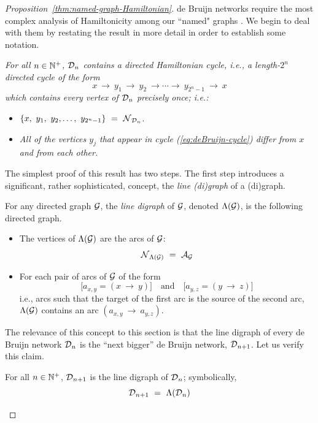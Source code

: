 \begin{proof}[Proposition~\ref{thm:named-graph-Hamiltonian}]
de Bruijn networks require the most complex analysis of Hamiltonicity among our  ``named" graphs .  We begin to deal with them by restating the result in more detail in order to establish some notation.

\medskip

\noindent
{\em
For all $n \in \mathbb{N}^+$, $\mbox{$\cal D$}_n$ contains a {\em directed Hamiltonian cycle}, i.e., a length-$2^n$ 
directed cycle of the form}
\begin{equation}
\label{eq:deBruijn-cycle}
 x \ \rightarrow \ y_1 \ \rightarrow \ y_2 \ \rightarrow \cdots  \rightarrow \ y_{2^n-1} \ \rightarrow \ x
\end{equation}
{\em which contains every vertex of $\mbox{$\cal D$}_n$ precisely once; i.e.:}
\begin{itemize}
\item
$\{x, \ y_1, \ y_2, \ldots, \ y_{2^n-1}\} \ = \ \n_{\fd_n}$.
\medskip\item
{\em All of the vertices $y_j$ that appear in cycle (\ref{eq:deBruijn-cycle}) differ from $x$ and from each other.}
\end{itemize}

The simplest proof of this result has two steps.  The first step introduces a significant, rather
sophisticated, concept, the {\it line (di)graph} of a (di)graph.

\bigskip

 

For any directed graph $\mbox{$\cal G$}$, the {\it line digraph} of $\mbox{$\cal G$}$, denoted $\Lambda(\mbox{$\cal G$})$, is the following directed graph.
\begin{itemize}
\item
The vertices of $\Lambda(\mbox{$\cal G$})$ are the arcs of $\mbox{$\cal G$}$:
\[ \n_{{\Lambda}({\cal G})} \ = \ \a_{\fg} \]

\medskip\item
For each pair of arcs of $\mbox{$\cal G$}$ of the form
\[ \big[a_{x,y} = (x \ \rightarrow \ y) \big] \ \ \ \mbox{ and } \ \ \ 
\big[a_{y,z} = (y \ \rightarrow \ z) \big]
\]
i.e., arcs such that the target of the first arc is the source of the second arc, $\Lambda(\mbox{$\cal G$})$ contains an arc $(a_{x,y} \ \rightarrow \ a_{y,z})$.
\end{itemize}
The relevance of this concept to this section is that the line digraph of every de Bruijn network $\mbox{$\cal D$}_n$ is the ``next bigger'' de Bruijn network, $\mbox{$\cal D$}_{n+1}$.  Let us verify this claim.

\begin{lemma}
\label{thm:deBruin-linegraph}
For all $n \in \mathbb{N}^+$, $\mbox{$\cal D$}_{n+1}$ is the line digraph of $\mbox{$\cal D$}_n$; symbolically,
\[ \mbox{$\cal D$}_{n+1} \ = \ \Lambda(\mbox{$\cal D$}_n) \]
\end{lemma}


\end{proof}

